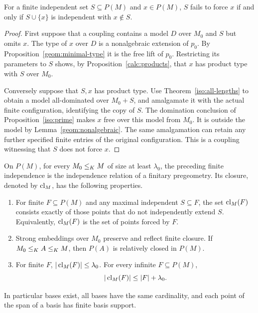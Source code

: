 \begin{lemma}
\label{geom:containment-test}
For a finite independent set $S\subseteq P(M)$ and $x\in P(M)$,
$S$ fails to force $x$ if and only if $S\cup\{x\}$ is independent
with $x\notin S$.
\end{lemma}

\begin{proof}
First suppose that a coupling contains a model $D$ over $M_0$ and $S$
but omits $x$.  The type of $x$ over $D$ is a nonalgebraic extension of
$p_0$.  By Proposition~\ref{geom:minimal-type} it is the free lift of
$p_0$.  Restricting its parameters to $S$ shows, by
Proposition~\ref{calc:products}, that $x$ has product type with $S$ over
$M_0$.

Conversely suppose that $S,x$ has product type.  Use
Theorem~\ref{iso:all-lengths} to obtain a model all-dominated over
$M_0+S$, and amalgamate it with the actual finite configuration,
identifying the copy of $S$.  The domination conclusion of
Proposition~\ref{iso:prime} makes $x$ free over this model from $M_0$.
It is outside the model by Lemma~\ref{geom:nonalgebraic}.  The same
amalgamation can retain any further specified finite entries of the
original configuration.  This is a coupling witnessing that $S$ does
not force $x$.
\end{proof}

\begin{theorem}
\label{geom:pregeometry}
On $P(M)$, for every $M_0\leq_K M$ of size at least $\lambda_0$,
the preceding finite independence is the independence relation of a
finitary pregeometry.  Its closure, denoted by $\operatorname{cl}_M$, has the
following properties.
\begin{enumerate}
\item For finite $F\subseteq P(M)$ and any maximal independent
      $S\subseteq F$, the set $\operatorname{cl}_M(F)$ consists exactly of those
      points that do not independently extend $S$.  Equivalently,
      $\operatorname{cl}_M(F)$ is the set of points forced by $F$.
\item Strong embeddings over $M_0$ preserve and reflect finite
      closure.  If $M_0\leq_K A\leq_K M$, then
      $P(A)$ is relatively closed in $P(M)$.
\item For finite $F$, $|\operatorname{cl}_M(F)|\leq\lambda_0$.  For every infinite
      $F\subseteq P(M)$,
      \[
      |\operatorname{cl}_M(F)|\leq |F|+\lambda_0.
      \]
\end{enumerate}
In particular bases exist, all bases have the same cardinality, and
each point of the span of a basis has finite basis support.
\end{theorem}

